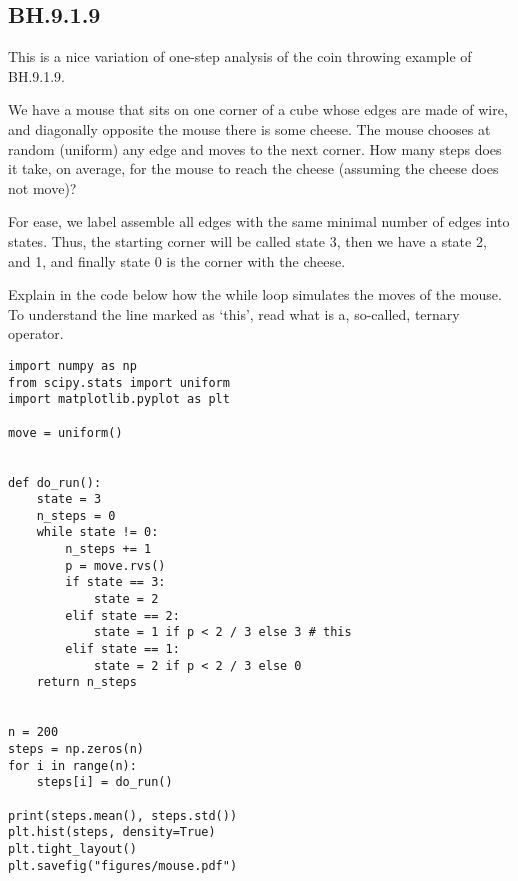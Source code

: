 \subsection{BH.9.1.9}
\label{sec:not-niet}

This is a nice variation of one-step analysis of the coin throwing example of BH.9.1.9.

We have a mouse that sits on one corner of a cube whose edges are made of wire, and  diagonally opposite the mouse there is some cheese.
The mouse chooses at random (uniform) any edge and moves to the next corner.
How many steps does it take, on average, for the mouse to reach the cheese (assuming the cheese does not move)?

For ease, we label assemble  all edges with the same minimal number of edges into states. Thus, the starting corner will be called state 3, then we have a state 2, and 1, and finally state 0 is the corner with the cheese.

\begin{exercise}
Explain in the code below how the while loop simulates the moves of the mouse.  To understand the line marked as `this', read what is a, so-called, ternary operator.
\begin{verbatim}
import numpy as np
from scipy.stats import uniform
import matplotlib.pyplot as plt

move = uniform()


def do_run():
    state = 3
    n_steps = 0
    while state != 0:
        n_steps += 1
        p = move.rvs()
        if state == 3:
            state = 2
        elif state == 2:
            state = 1 if p < 2 / 3 else 3 # this
        elif state == 1:
            state = 2 if p < 2 / 3 else 0
    return n_steps


n = 200
steps = np.zeros(n)
for i in range(n):
    steps[i] = do_run()

print(steps.mean(), steps.std())
plt.hist(steps, density=True)
plt.tight_layout()
plt.savefig("figures/mouse.pdf")
\end{verbatim}

\begin{solution}
\end{solution}
\end{exercise}
